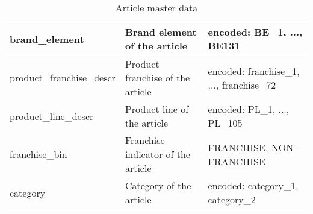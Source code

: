 \begin{table}[H]
\begin{adjustbox}{max width=\textwidth}
\begin{tabular}{|l|l|l|}
brand\_element            & Brand element of the article                           & encoded: BE\_1, ..., BE131                    \\ \hline
product\_franchise\_descr & Product franchise of the article                       & encoded: franchise\_1, ..., franchise\_72     \\ \hline
product\_line\_descr      & Product line of the article                            & encoded: PL\_1, ..., PL\_105                  \\ \hline
franchise\_bin            & Franchise indicator of the article                     & FRANCHISE, NON-FRANCHISE                      \\ \hline
category                  & Category of the article                                & encoded: category\_1, category\_2             \\ \hline
\end{tabular}
\end{adjustbox}
\caption{Article master data}
\label{tab:article_master_data}
\end{table}



